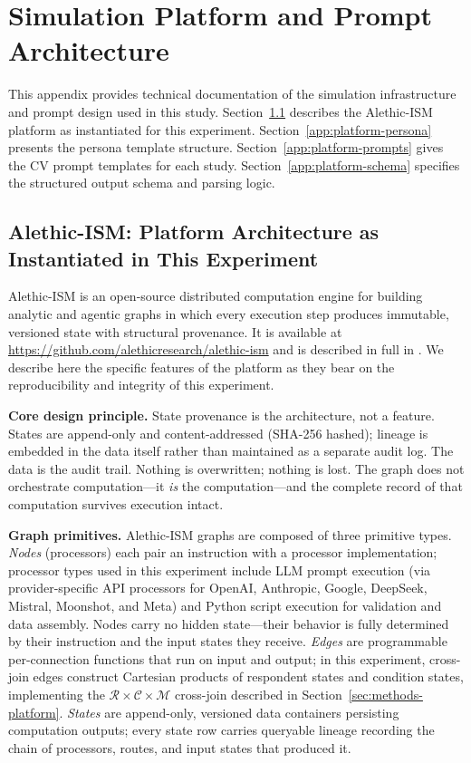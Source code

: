 \documentclass[12pt]{article}
\begin{document}
\section{Simulation Platform and Prompt Architecture}\label{app:platform}

This appendix provides technical documentation of the simulation infrastructure and prompt design used in this study. Section~\ref{app:platform-ism} describes the Alethic-ISM platform as instantiated for this experiment. Section~\ref{app:platform-persona} presents the persona template structure. Section~\ref{app:platform-prompts} gives the CV prompt templates for each study. Section~\ref{app:platform-schema} specifies the structured output schema and parsing logic.

\subsection{Alethic-ISM: Platform Architecture as Instantiated in This Experiment}\label{app:platform-ism}

Alethic-ISM is an open-source distributed computation engine for building analytic and agentic graphs in which every execution step produces immutable, versioned state with structural provenance. It is available at \url{https://github.com/alethicresearch/alethic-ism} and is described in full in \textcite{GhoseRasaee2026}. We describe here the specific features of the platform as they bear on the reproducibility and integrity of this experiment.

\medskip\noindent\textbf{Core design principle.} State provenance is the architecture, not a feature. States are append-only and content-addressed (SHA-256 hashed); lineage is embedded in the data itself rather than maintained as a separate audit log. The data is the audit trail. Nothing is overwritten; nothing is lost. The graph does not orchestrate computation---it \textit{is} the computation---and the complete record of that computation survives execution intact.

\medskip\noindent\textbf{Graph primitives.} Alethic-ISM graphs are composed of three primitive types. \textit{Nodes} (processors) each pair an instruction with a processor implementation; processor types used in this experiment include LLM prompt execution (via provider-specific API processors for OpenAI, Anthropic, Google, DeepSeek, Mistral, Moonshot, and Meta) and Python script execution for validation and data assembly. Nodes carry no hidden state---their behavior is fully determined by their instruction and the input states they receive. \textit{Edges} are programmable per-connection functions that run on input and output; in this experiment, cross-join edges construct Cartesian products of respondent states and condition states, implementing the $\mathcal{R} \times \mathcal{C} \times \mathcal{M}$ cross-join described in Section~\ref{sec:methods-platform}. \textit{States} are append-only, versioned data containers persisting computation outputs; every state row carries queryable lineage recording the chain of processors, routes, and input states that produced it.
\end{document}
